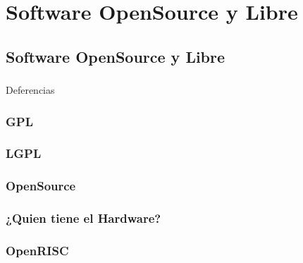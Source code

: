 \chapter{Software OpenSource y Libre}
	

\section{Software OpenSource y Libre}


		\subsection{}{Deferencias}%

		\subsection{GPL}
		\subsection{LGPL}
		\subsection{OpenSource}

		\subsection{¿Quien tiene el Hardware?}

		\subsection{OpenRISC}



